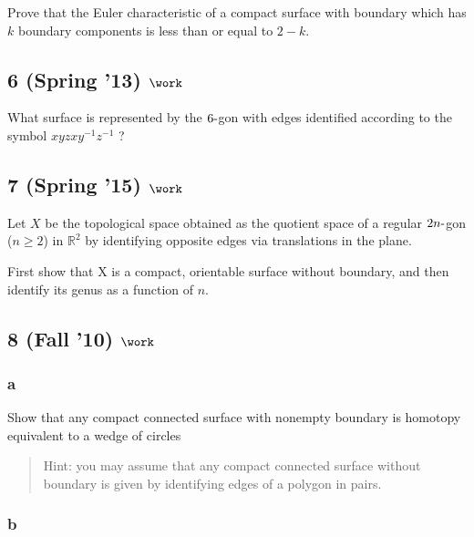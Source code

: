 Prove that the Euler characteristic of a compact surface with boundary
which has \(k\) boundary components is less than or equal to \(2 - k\).

\hypertarget{spring-13-work-4}{%
\subsection{\texorpdfstring{6 (Spring '13)
\(\work\)}{6 (Spring '13) \textbackslash work}}\label{spring-13-work-4}}

What surface is represented by the \(6{\hbox{-}}\)gon with edges
identified according to the symbol \(xyzxy^{-1}z^{-1}\) ?

\hypertarget{spring-15-work-4}{%
\subsection{\texorpdfstring{7 (Spring '15)
\(\work\)}{7 (Spring '15) \textbackslash work}}\label{spring-15-work-4}}

Let \(X\) be the topological space obtained as the quotient space of a
regular \(2n{\hbox{-}}\)gon (\(n \geq 2\)) in \({\mathbb{R}}^2\) by
identifying opposite edges via translations in the plane.

First show that X is a compact, orientable surface without boundary, and
then identify its genus as a function of \(n\).

\hypertarget{fall-10-work-2}{%
\subsection{\texorpdfstring{8 (Fall '10)
\(\work\)}{8 (Fall '10) \textbackslash work}}\label{fall-10-work-2}}

\hypertarget{a-3}{%
\subsubsection{a}\label{a-3}}

Show that any compact connected surface with nonempty boundary is
homotopy equivalent to a wedge of circles

\begin{quote}
Hint: you may assume that any compact connected surface without boundary
is given by identifying edges of a polygon in pairs.
\end{quote}

\hypertarget{b-3}{%
\subsubsection{b}\label{b-3}}

